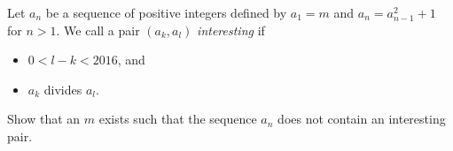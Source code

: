 Let $a_n$ be a sequence of positive integers defined by $a_1 = m$ and $a_n = a^2_{n-1}+1$ for $n>1$. We call a pair $(a_k, a_l)$ \emph{interesting} if
\begin{itemize}
    \item $0<l-k<2016$, and
    \item $a_k$ divides $a_l$.
\end{itemize}
Show that an $m$ exists such that the sequence $a_n$ does not contain an interesting pair.
